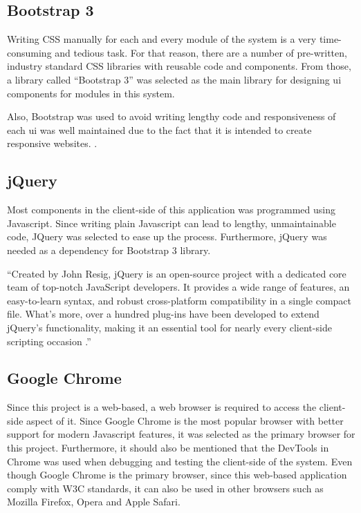 \documentclass[12pt]{report}
\begin{document}
\subsection{Bootstrap 3}
Writing CSS manually for each and every module of the system is a very time-consuming and tedious task. For that reason, there are a number of pre-written, industry standard CSS libraries with reusable code and components. From those, a library called ``Bootstrap 3'' was selected as the main library for designing \acrshort{ui} components for modules in this system.

Also, Bootstrap was used to avoid writing lengthy code and responsiveness of each \acrshort{ui} was well maintained due to the fact that it is intended to create responsive websites. \cite{chahal_2019_what}.

\subsection{jQuery}
Most components in the client-side of this application was programmed using Javascript. Since writing plain Javascript can lead to lengthy, unmaintainable code, JQuery was selected to ease up the process. Furthermore, jQuery was needed as a dependency for Bootstrap 3 library.

``Created by John Resig, jQuery is an open-source project with a dedicated core team of top-notch JavaScript developers. It provides a wide range of features, an easy-to-learn syntax, and robust cross-platform compatibility in a single compact file. What's
more, over a hundred plug-ins have been developed to extend jQuery's functionality, making it an essential tool for nearly every client-side scripting occasion \cite{chaffer_2007_learning}.''

\subsection{Google Chrome}
Since this project is a web-based, a web browser is required to access the client-side aspect of it. Since Google Chrome is the most popular browser with better support for modern Javascript features, it was selected as the primary browser for this project. Furthermore, it should also be mentioned that the DevTools in Chrome was used when debugging and testing the client-side of the system. Even though Google Chrome is the primary browser, since this web-based application comply with W3C standards, it can also be used in other browsers such as Mozilla Firefox, Opera and Apple Safari.
\end{document}
